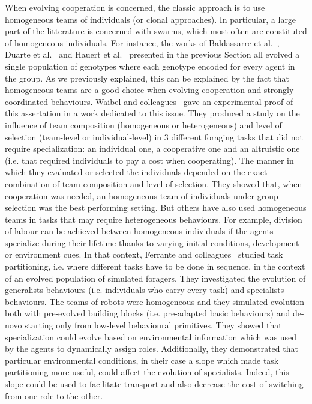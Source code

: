     When evolving cooperation is concerned, the classic approach is to use homogeneous teams of individuals (or clonal approaches). In particular, a large part of the litterature is concerned with swarms, which most often are constituted of homogeneous individuals. For instance, the works of Baldassarre et al.~\parencite{Baldassarre2007}, Duarte et al.~\parencite{Duarte2016} and Hauert et al.~\parencite{Hauert2009} presented in the previous Section all evolved a single population of genotypes where each genotype encoded for every agent in the group. As we previously explained, this can be explained by the fact that homogeneous teams are a good choice when evolving cooperation and strongly coordinated behaviours. Waibel and colleagues~\parencite{Waibel2009} gave an experimental proof of this assertation in a work dedicated to this issue. They produced a study on the influence of team composition (homogeneous or heterogeneous) and level of selection (team-level or individual-level) in $3$ different foraging tasks that did not require specialization: an individual one, a cooperative one and an altruistic one (i.e. that required individuals to pay a cost when cooperating). The manner in which they evaluated or selected the individuals depended on the exact combination of team composition and level of selection. They showed that, when cooperation was needed, an homogeneous team of individuals under group selection was the best performing setting. But others have also used homogeneous teams in tasks that may require heterogeneous behaviours. For example, division of labour can be achieved between homogeneous individuals if the agents specialize during their lifetime thanks to varying initial conditions, development or environment cues. In that context, Ferrante and colleagues~\parencite{Ferrante2015} studied task partitioning, i.e. where different tasks have to be done in sequence, in the context of an evolved population of simulated foragers. They investigated the evolution of generalists behaviours (i.e. individuals who carry every task) and specialists behaviours. The teams of robots were homogeneous and they simulated evolution both with pre-evolved building blocks (i.e. pre-adapted basic behaviours) and de-novo starting only from low-level behavioural primitives. They showed that specialization could evolve based on environmental information which was used by the agents to dynamically assign roles. Additionally, they demonstrated that particular environmental conditions, in their case a slope which made task partitioning more useful, could affect the evolution of specialists. Indeed, this slope could be used to facilitate transport and also decrease the cost of switching from one role to the other.

